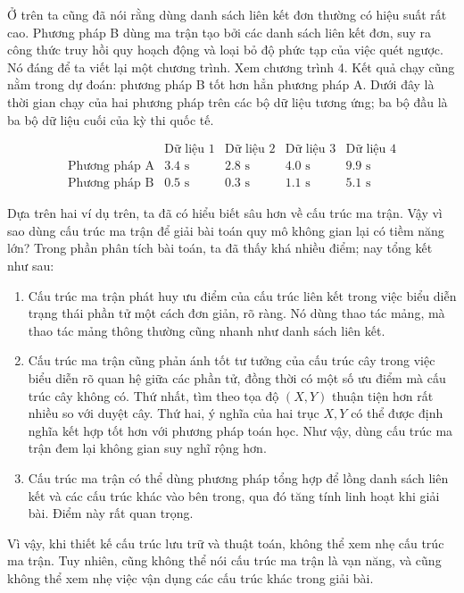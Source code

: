 \documentclass[11pt]{article}
\begin{document}
Ở trên ta cũng đã nói rằng dùng danh sách liên kết đơn thường có hiệu suất
rất cao. Phương pháp B dùng ma trận tạo bởi các danh sách liên kết đơn, suy
ra công thức truy hồi quy hoạch động và loại bỏ độ phức tạp của việc quét
ngược. Nó đáng để ta viết lại một chương trình. Xem chương trình 4. Kết quả
chạy cũng nằm trong dự đoán: phương pháp B tốt hơn hẳn phương pháp A. Dưới
đây là thời gian chạy của hai phương pháp trên các bộ dữ liệu tương ứng; ba
bộ đầu là ba bộ dữ liệu cuối của kỳ thi quốc tế.

\[
\begin{array}{c|cccc}
& \text{Dữ liệu 1} & \text{Dữ liệu 2} & \text{Dữ liệu 3} & \text{Dữ liệu 4}\\
\hline
\text{Phương pháp A} & 3.4\text{ s} & 2.8\text{ s} & 4.0\text{ s} & 9.9\text{ s}\\
\text{Phương pháp B} & 0.5\text{ s} & 0.3\text{ s} & 1.1\text{ s} & 5.1\text{ s}
\end{array}
\]

Dựa trên hai ví dụ trên, ta đã có hiểu biết sâu hơn về cấu trúc ma trận. Vậy
vì sao dùng cấu trúc ma trận để giải bài toán quy mô không gian lại có tiềm
năng lớn? Trong phần phân tích bài toán, ta đã thấy khá nhiều điểm; nay tổng
kết như sau:

\begin{enumerate}
  \item Cấu trúc ma trận phát huy ưu điểm của cấu trúc liên kết trong việc
  biểu diễn trạng thái phần tử một cách đơn giản, rõ ràng. Nó dùng thao tác
  mảng, mà thao tác mảng thông thường cũng nhanh như danh sách liên kết.
  \item Cấu trúc ma trận cũng phản ánh tốt tư tưởng của cấu trúc cây trong
  việc biểu diễn rõ quan hệ giữa các phần tử, đồng thời có một số ưu điểm mà
  cấu trúc cây không có. Thứ nhất, tìm theo tọa độ \((X,Y)\) thuận tiện hơn
  rất nhiều so với duyệt cây. Thứ hai, ý nghĩa của hai trục \(X,Y\) có thể
  được định nghĩa kết hợp tốt hơn với phương pháp toán học. Như vậy, dùng
  cấu trúc ma trận đem lại không gian suy nghĩ rộng hơn.
  \item Cấu trúc ma trận có thể dùng phương pháp tổng hợp để lồng danh sách
  liên kết và các cấu trúc khác vào bên trong, qua đó tăng tính linh hoạt khi
  giải bài. Điểm này rất quan trọng.
\end{enumerate}

Vì vậy, khi thiết kế cấu trúc lưu trữ và thuật toán, không thể xem nhẹ cấu
trúc ma trận. Tuy nhiên, cũng không thể nói cấu trúc ma trận là vạn năng, và
cũng không thể xem nhẹ việc vận dụng các cấu trúc khác trong giải bài.
\end{document}
